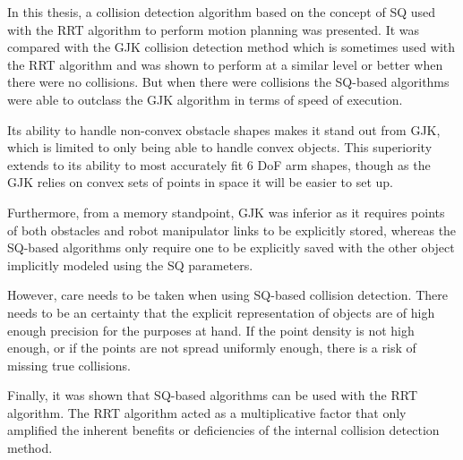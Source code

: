 In this thesis, a collision detection algorithm based on the concept of \gls{SQ} used with the \gls{RRT} algorithm to perform motion planning was presented. It was compared with the \gls{GJK} collision detection method which is sometimes used with the \gls{RRT} algorithm and was shown to perform at a similar level or better when there were no collisions. But when there were collisions the \gls{SQ}-based algorithms were able to outclass the \gls{GJK} algorithm in terms of speed of execution.

Its ability to handle non-convex obstacle shapes makes it stand out from \gls{GJK}, which is limited to only being able to handle convex objects. This superiority extends to its ability to most accurately fit 6 \gls{DoF} arm shapes, though as the \gls{GJK} relies on convex sets of points in space it will be easier to set up. 

Furthermore, from a memory standpoint, \gls{GJK} was inferior as it requires points of both obstacles and robot manipulator links to be explicitly stored, whereas the \gls{SQ}-based algorithms only require one to be explicitly saved with the other object implicitly modeled using the \gls{SQ} parameters. 

However, care needs to be taken when using \gls{SQ}-based collision detection. There needs to be an certainty that the explicit representation of objects are of high enough precision for the purposes at hand. If the point density is not high enough, or if the points are not spread uniformly enough, there is a risk of missing true collisions.  

Finally, it was shown that \gls{SQ}-based algorithms can be used with the \gls{RRT} algorithm. The \gls{RRT} algorithm acted as a multiplicative factor that only amplified the inherent benefits or deficiencies of the internal collision detection method.

